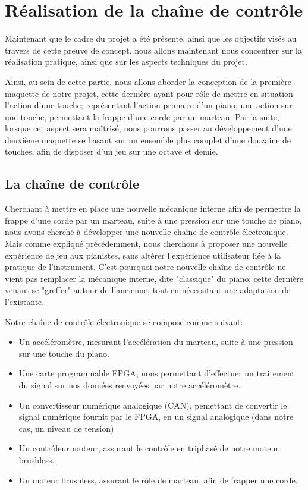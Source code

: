\documentclass[french,a4paper,12pt]{report}
\begin{document}
	\part{Réalisation de la chaîne de contrôle}	
	
	Maintenant que le cadre du projet a été présenté, ainsi que les objectifs visés au travers de cette preuve de concept, nous allons maintenant nous concentrer sur la réalisation pratique, ainsi que sur les aspects techniques du projet.
	
	Ainsi, au sein de cette partie, nous allons aborder la conception de la première maquette de notre projet, cette dernière ayant pour rôle de mettre en situation l'action d'une touche; représentant l'action primaire d'un piano, une action sur une touche, permettant la frappe d'une corde par un marteau. Par la suite, lorsque cet aspect sera maîtrisé, nous pourrons passer au développement d'une deuxième maquette se basant sur un ensemble plus complet d'une douzaine de touches, afin de disposer d'un jeu sur une octave et demie.
	
		\chapter{La chaîne de contrôle}
		
		Cherchant à mettre en place une nouvelle mécanique interne afin de permettre la frappe d'une corde par un marteau, suite à une pression sur une touche de piano, nous avons cherché à développer une nouvelle chaîne de contrôle électronique.
		Mais comme expliqué précédemment, nous cherchons à proposer une nouvelle expérience de jeu aux pianistes, sans altérer l'expérience utilisateur liée à la pratique de l'instrument. C'est pourquoi notre nouvelle chaîne de contrôle ne vient pas remplacer la mécanique interne, dite "classique" du piano; cette dernière venant se "greffer" autour de l'ancienne, tout en nécessitant une adaptation de l'existante.
		
		Notre chaîne de contrôle électronique se compose comme suivant:
		\begin{itemize}
			\item Un accéléromètre, mesurant l'accélération du marteau, suite à une pression sur une touche du piano.
			\item Une carte programmable FPGA, nous permettant d'effectuer un traitement du signal sur nos données renvoyées par notre accéléromètre.
			\item Un convertisseur numérique analogique (CAN), pemettant de convertir le signal numérique fournit par le FPGA, en un signal analogique (dans notre cas, un niveau de tension)
			\item Un contrôleur moteur, assurant le contrôle en triphasé de notre moteur brushless.
			\item Un moteur brushless, assurant le rôle de marteau, afin de frapper une corde.
		\end{itemize}
		
\end{document}

